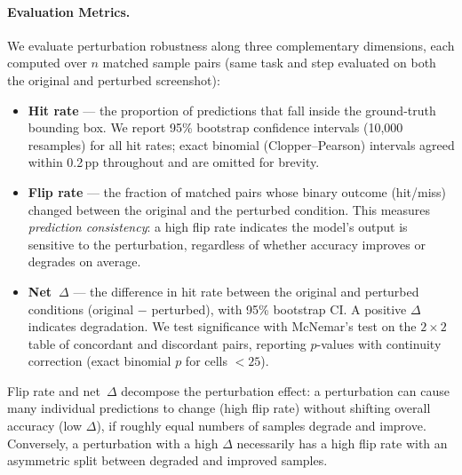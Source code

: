 \paragraph{Evaluation Metrics.}
We evaluate perturbation robustness along three complementary dimensions,
each computed over $n$ matched sample pairs (same task and step evaluated on
both the original and perturbed screenshot):

\begin{itemize}[nosep]
  \item \textbf{Hit rate} --- the proportion of predictions that fall inside
    the ground-truth bounding box. We report 95\% bootstrap confidence
    intervals (10{,}000 resamples) for all hit rates; exact binomial
    (Clopper--Pearson) intervals agreed within 0.2\,pp throughout and are
    omitted for brevity.
  \item \textbf{Flip rate} --- the fraction of matched pairs whose binary
    outcome (hit/miss) changed between the original and the perturbed
    condition. This measures \emph{prediction consistency}: a high flip rate
    indicates the model's output is sensitive to the perturbation, regardless
    of whether accuracy improves or degrades on average.
  \item \textbf{Net~$\Delta$} --- the difference in hit rate between the
    original and perturbed conditions (original $-$ perturbed), with 95\%
    bootstrap CI. A positive $\Delta$ indicates degradation. We test
    significance with McNemar's test on the $2\times2$ table of concordant
    and discordant pairs, reporting $p$-values with continuity correction
    (exact binomial $p$ for cells $<25$).
\end{itemize}

Flip rate and net~$\Delta$ decompose the perturbation effect: a perturbation
can cause many individual predictions to change (high flip rate) without
shifting overall accuracy (low $\Delta$), if roughly equal numbers of
samples degrade and improve. Conversely, a perturbation with a high
$\Delta$ necessarily has a high flip rate with an asymmetric split between
degraded and improved samples.

